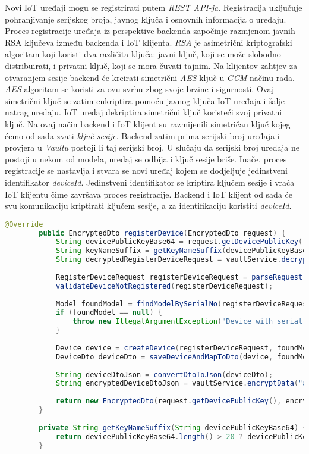 \documentclass[zavrsnirad]{fer}
\begin{document}
	Novi IoT uređaji mogu se registrirati putem \textit{REST API-ja}.
	Registracija uključuje pohranjivanje serijskog broja, javnog ključa i osnovnih informacija o uređaju. Proces registracije uređaja iz perspektive backenda započinje razmjenom javnih RSA ključeva između backenda i IoT klijenta. \textit{RSA} je asimetrični kriptografski algoritam koji koristi dva različita ključa: javni ključ, koji se može slobodno distribuirati, i privatni ključ, koji se mora čuvati tajnim. Na klijentov zahtjev za otvaranjem sesije backend će kreirati simetrični \textit{AES} ključ u \textit{GCM} načinu rada. \textit{AES} algoritam se koristi za ovu svrhu zbog svoje brzine i sigurnosti. Ovaj simetrični ključ se zatim enkriptira pomoću javnog ključa IoT uređaja i šalje natrag uređaju. IoT uređaj dekriptira simetrični ključ koristeći svoj privatni ključ. Na ovaj način backend i IoT klijent su razmijenili simetričan ključ kojeg ćemo od sada zvati \textit{ključ sesije}. Backend zatim prima serijski broj uređaja i provjera u \textit{Vaultu} postoji li taj serijski broj. U slučaju da serijski broj uređaja ne postoji u nekom od modela, uređaj se odbija i ključ sesije briše. Inače, proces registracije se nastavlja i stvara se novi uređaj kojem se dodjeljuje jedinstveni identifikator \textit{deviceId}. Jedinstveni identifikator se kriptira ključem sesije i vraća IoT klijentu čime završava proces registracije. Backend i IoT klijent od sada će svu komunikaciju kriptirati ključem sesije, a za identifikaciju koristiti \textit{deviceId}.
	
	\begin{lstlisting}[language=Java, caption=Register Device]
		@Override
		public EncryptedDto registerDevice(EncryptedDto request) {
			String devicePublicKeyBase64 = request.getDevicePublicKey();
			String keyNameSuffix = getKeyNameSuffix(devicePublicKeyBase64);
			String decryptedRegisterDeviceRequest = vaultService.decryptData("aes-key-" + keyNameSuffix, request.getEncryptedData());
			
			RegisterDeviceRequest registerDeviceRequest = parseRequest(decryptedRegisterDeviceRequest);
			validateDeviceNotRegistered(registerDeviceRequest);
			
			Model foundModel = findModelBySerialNo(registerDeviceRequest.getSerialNo());
			if (foundModel == null) {
				throw new IllegalArgumentException("Device with serial number: '" + registerDeviceRequest.getSerialNo() + "' cannot be registered!");
			}
			
			Device device = createDevice(registerDeviceRequest, foundModel);
			DeviceDto deviceDto = saveDeviceAndMapToDto(device, foundModel);
			
			String deviceDtoJson = convertDtoToJson(deviceDto);
			String encryptedDeviceDtoJson = vaultService.encryptData("aes-key-" + keyNameSuffix, deviceDtoJson);
			
			return new EncryptedDto(request.getDevicePublicKey(), encryptedDeviceDtoJson);
		}
		
		private String getKeyNameSuffix(String devicePublicKeyBase64) {
			return devicePublicKeyBase64.length() > 20 ? devicePublicKeyBase64.substring(10, 20) : devicePublicKeyBase64;
		}
	\end{lstlisting}
	
\end{document}
